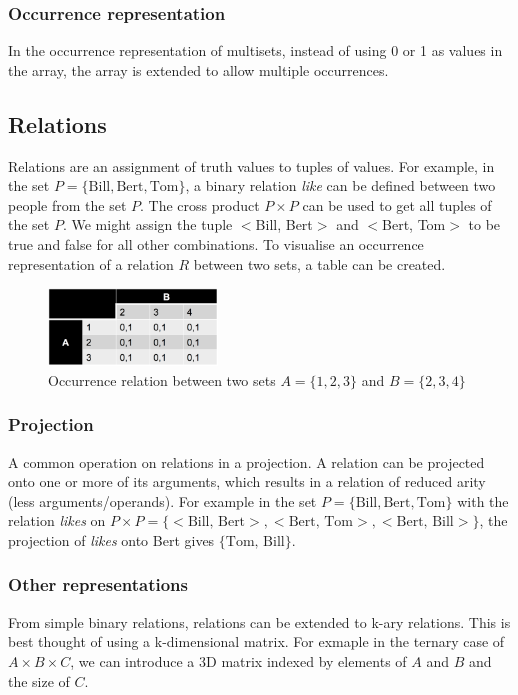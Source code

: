 \documentclass[CS4402-Notes.tex]{subfiles}
\begin{document}
\subsubsection{Occurrence representation}
In the occurrence representation of multisets, instead of using 0 or 1 as values in the array, the array is extended to allow multiple occurrences.

\subsection{Relations}
Relations are an assignment of truth values to tuples of values. For example, in the set $P = \{\text{Bill}, \text{Bert}, \text{Tom}\}$, a binary relation \textit{like} can be defined between two people from the set $P$. The cross product $P \times P$ can be used to get all tuples of the set $P$. We might assign the tuple $<$Bill, Bert$>$ and $<$Bert, Tom$>$ to be true and false for all other combinations. To visualise an occurrence representation of a relation $R$ between two sets, a table can be created.
\begin{figure}[H]
\centering
\includegraphics[width=0.4\textwidth, keepaspectratio]{imgs/relation-occurrence.png}
\caption{Occurrence relation between two sets $A = \{1,2,3\}$ and $B = \{2,3,4\}$}
\end{figure}
\noindent

\subsubsection{Projection}
A common operation on relations in a projection. A relation can be projected onto one or more of its arguments, which results in a relation of reduced arity (less arguments/operands). For example in the set $P = \{\text{Bill}, \text{Bert}, \text{Tom}\}$ with the relation \textit{likes} on $P \times P = \{<\text{Bill, Bert}>, <\text{Bert, Tom}>, <\text{Bert, Bill}>\}$, the projection of \textit{likes} onto Bert gives $\{\text{Tom, Bill}\}$.

\subsubsection{Other representations}
From simple binary relations, relations can be extended to k-ary relations. This is best thought of using a k-dimensional matrix. For exmaple in the ternary case of $A \times B \times C$, we can introduce a 3D matrix indexed by elements of $A$ and $B$ and the size of $C$.
\end{document}
